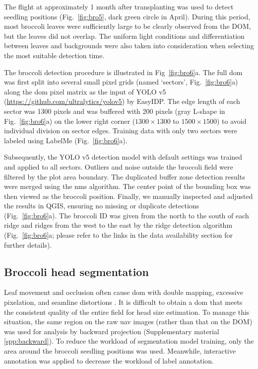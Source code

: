 The flight at approximately 1 month after transplanting was used to detect seedling positions (Fig.~\ref{fig:bro5}, dark green circle in April). During this period, most broccoli leaves were sufficiently large to be clearly observed from the DOM, but the leaves did not overlap. The uniform light conditions and differentiation between leaves and backgrounds were also taken into consideration when selecting the most suitable detection time.

The broccoli detection procedure is illustrated in Fig~\ref{fig:bro6}a. The full \gls{dom} was first split into several small pixel grids (named `sectors', Fig.~\ref{fig:bro6}a) along the \gls{dom} pixel matrix as the input of YOLO v5 (\url{https://github.com/ultralytics/yolov5}) by EasyIDP. The edge length of each sector was 1300 pixels and was buffered with 200 pixels (gray L-shape in Fig.~\ref{fig:bro6}a) on the lower right corner ($1300 \times 1300$ to $1500 \times 1500$) to avoid individual division on sector edges. Training data with only two sectors were labeled using LabelMe (Fig.~\ref{fig:bro6}a). 

Subsequently, the YOLO v5 detection model with default settings was trained and applied to all sectors. Outliers and noise outside the broccoli field were filtered by the plot area boundary. The duplicated buffer zone detection results were merged using the \gls{nms} algorithm. The center point of the bounding box was then viewed as the broccoli position. Finally, we manually inspected and adjusted the results in QGIS, ensuring no missing or duplicate detections (Fig.~\ref{fig:bro6}a). The broccoli ID was given from the north to the south of each ridge and ridges from the west to the east by the ridge detection algorithm (Fig.~\ref{fig:bro6}a; please refer to the links in the data availability section for further details). 

\subsection{Broccoli head segmentation} \label{sec:seg}

Leaf movement and occlusion often cause \gls{dom} with double mapping, excessive pixelation, and seamline distortions \citep{lin_new_2021}. It is difficult to obtain a \gls{dom} that meets the consistent quality of the entire field for head size estimation. To manage this situation, the same region on the raw \gls{uav} images (rather than that on the DOM) was used for analysis by backward projection (Supplementary material \ref{spp:backward}). To reduce the workload of segmentation model training, only the area around the broccoli seedling positions was used. Meanwhile, interactive annotation \citep{ghosal_weakly_2019} was applied to decrease the workload of label annotation. 

